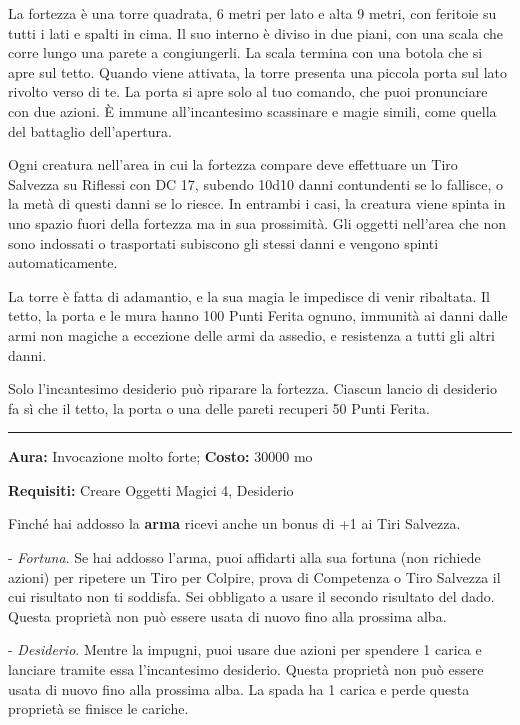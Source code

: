 \begin{multicols}{2}
La fortezza è una torre quadrata, 6 metri per lato e alta 9 metri, con feritoie su tutti i lati e spalti in cima. Il suo interno è diviso in due piani, con una scala che corre lungo una parete a congiungerli. La scala termina con una botola che si apre sul tetto. Quando viene attivata, la torre presenta una piccola porta sul lato rivolto verso di te. La porta si apre solo al tuo comando, che puoi pronunciare con due azioni. È immune all'incantesimo scassinare e magie simili, come quella del battaglio dell'apertura.

Ogni creatura nell'area in cui la fortezza compare deve effettuare un Tiro Salvezza su Riflessi con DC 17, subendo 10d10 danni contundenti se lo fallisce, o la metà di questi danni se lo riesce. In entrambi i casi, la creatura viene spinta in uno spazio fuori della fortezza ma in sua prossimità. Gli oggetti nell'area che non sono indossati o trasportati subiscono gli stessi danni e vengono spinti automaticamente.

La torre è fatta di adamantio, e la sua magia le impedisce di venir ribaltata. Il tetto, la porta e le mura hanno 100 Punti Ferita ognuno, immunità ai danni dalle armi non magiche a eccezione delle armi da assedio, e resistenza a tutti gli altri danni.

Solo l'incantesimo desiderio può riparare la fortezza. Ciascun lancio di desiderio fa sì che il tetto, la porta o una delle pareti recuperi 50 Punti Ferita.

\smallskip\noindent\rule{\linewidth}{2pt}  \hypertarget{Fortunata}{}\medskip{}\noindent\label{Fortunata}

\textbf{Aura:} Invocazione molto forte; \textbf{Costo:} 30000 mo

\textbf{Requisiti:} Creare Oggetti Magici 4, Desiderio

Finché hai addosso la \textbf{arma} ricevi anche un bonus di +1 ai Tiri Salvezza.

- \emph{Fortuna}. Se hai addosso l'arma, puoi affidarti alla sua fortuna (non richiede azioni) per ripetere un Tiro per Colpire, prova di Competenza o Tiro Salvezza il cui risultato non ti soddisfa. Sei obbligato a usare il secondo risultato del dado. Questa proprietà non può essere usata di nuovo fino alla prossima alba.

- \emph{Desiderio}. Mentre la impugni, puoi usare due azioni per spendere 1 carica e lanciare tramite essa l'incantesimo desiderio. Questa proprietà non può essere usata di nuovo fino alla prossima alba. La spada ha 1 carica e perde questa proprietà se finisce le cariche.


\end{multicols}
